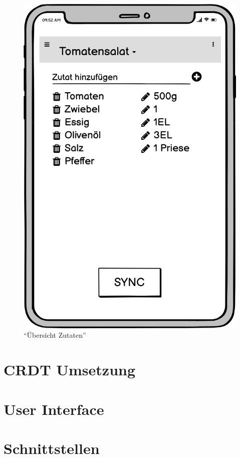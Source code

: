 \documentclass[a4paper, 12pt]{scrreprt}
\begin{document}
\begin{figure}
\begin{minipage}{.45\textwidth}
		\includegraphics[width=1\textwidth]{wireframeZutaten2.png}
		\caption{\enquote{Übersicht Zutaten}}
		\label{fig:zutatenFrame}
	\end{minipage}
\end{figure}



\section{CRDT Umsetzung}

\section{User Interface}
\section{Schnittstellen}
\newpage
\printbibliography
\end{document}
